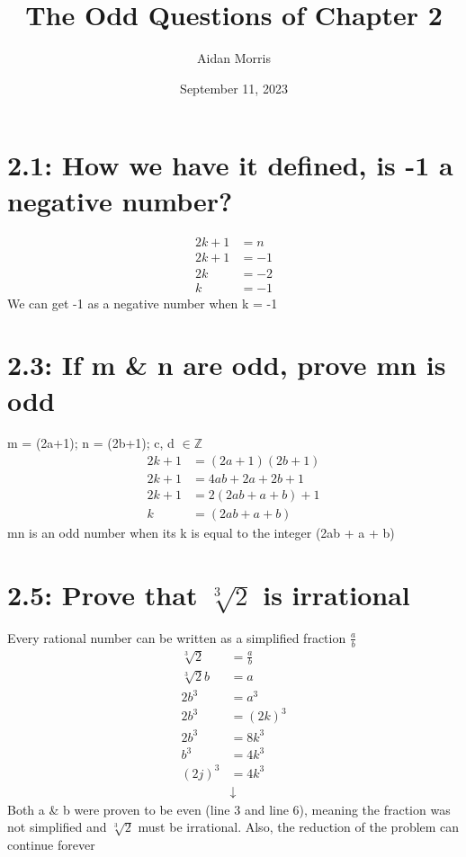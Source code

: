 \documentclass{article}
\title{The Odd Questions of Chapter 2}
\author{Aidan Morris}
\date{September 11, 2023}
\begin{document}
\maketitle
\pagebreak
\section*{2.1: How we have it defined, is -1 a negative number?}
\begin{align*}
  2k+1 &= n \\
  2k+1 &= -1 \\
  2k &= -2 \\
  k &= -1 
\end{align*}
We can get -1 as a negative number when k = -1 \\
\section*{2.3: If m \& n are odd, prove mn is odd} 
m = (2a+1); \:  n = (2b+1); \: c, d $\in \mathbb{Z}$
\begin{align*} 
2k + 1 &= (2a+1)(2b+1) \\
2k + 1 &= 4ab + 2a + 2b +1 \\
2k + 1 &= 2(2ab + a + b) + 1 \\
k &= (2ab + a + b) 
\end{align*} 
mn is an odd number when its k is equal to the integer (2ab + a + b) \\
\section*{2.5: Prove that $\sqrt[3]{2}$ is irrational} 
Every rational number can be written as a simplified fraction $\frac{a}{b}$ \\

\begin{align*}
\sqrt[3]{2} &= \frac{a}{b} \\
\sqrt[3]{2} b &= a \\
2b^3 &= a^3 \\
2b^3 &= (2k)^3 \\
2b^3 &= 8k^3 \\
b^3 &= 4k^3  \\
(2j)^3 &= 4k^3 \\
&\downarrow  
\end{align*}
Both a \& b were proven to be even (line 3 and line 6), meaning the fraction was not simplified and $\sqrt[3]{2}$ must be irrational. Also, the reduction of the problem can continue forever\\
\end{document}
